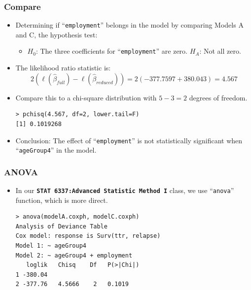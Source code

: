 \documentclass{beamer}
\newcommand{\pkg}[1]{{\textbf{\texttt{#1}}}}
\begin{document}
\pagebreak
\begin{frame}[fragile]
\frametitle{Compare}	
\begin{itemize}
\item Determining if ``\texttt{employment}'' belongs in the model by comparing Models A and C, the hypothesis test:
\begin{itemize}
\item $H_0$: The three coefficients for ``\texttt{employment}''  are zero. \linebreak
$H_A$: Not all zero.
\end{itemize}
\item The likelihood ratio statistic is: 
\begin{equation}
2(\ell(\hat{\beta}_{full})-\ell(\hat{\beta}_{reduced})) = 2(-377.7597+380.043) = 4.567
\end{equation}
\item Compare this to a chi-square distribution with $5 -3 = 2$ degrees of freedom.
\begin{Verbatim}
> pchisq(4.567, df=2, lower.tail=F)
[1] 0.1019268
\end{Verbatim}
\item Conclusion: The effect of ``\texttt{employment}'' is not statistically significant when ``\texttt{ageGroup4}'' in the model.
\end{itemize}
\end{frame}


\pagebreak
\begin{frame}[fragile]
\frametitle{ANOVA}	
\begin{itemize}
\item In our \pkg{STAT 6337:Advanced Statistic Method I} class, we use ``\texttt{anova}'' function, which is more direct.
\begin{Verbatim}
> anova(modelA.coxph, modelC.coxph)
Analysis of Deviance Table
Cox model: response is Surv(ttr, relapse)
Model 1: ~ ageGroup4
Model 2: ~ ageGroup4 + employment
   loglik   Chisq    Df   P(>|Chi|)
1 -380.04
2 -377.76   4.5666    2   0.1019
\end{Verbatim}
\end{itemize}
\end{frame}
\end{document}
